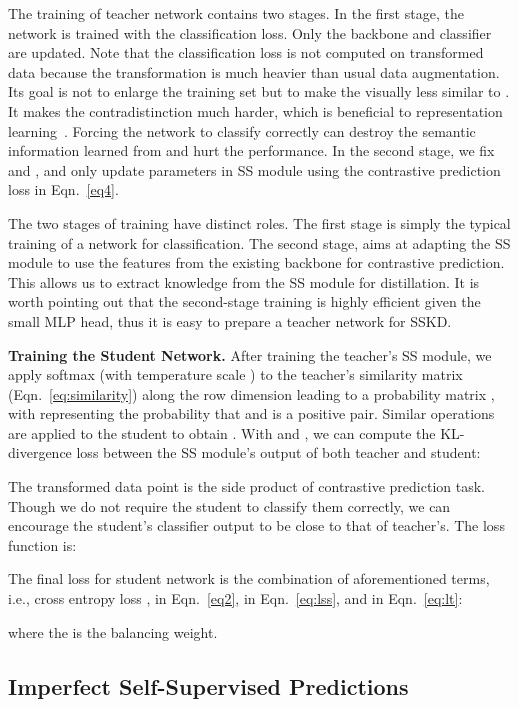 \documentclass[runningheads]{llncs}
\newcommand{\ie}{i.e.}
\begin{document}
The training of teacher network contains two stages. 
In the first stage, the network is trained with the classification loss. Only the backbone  and classifier  are updated. 
Note that the classification loss is not computed on transformed data  because the transformation  is much heavier than usual data augmentation. 
Its goal is not to enlarge the training set but to make the  visually less similar to . 
It makes the contradistinction much harder, which is beneficial to representation learning~\cite{SimCLR}. 
Forcing the network to classify  correctly can destroy the semantic information learned from  and hurt the performance.
In the second stage, we fix  and , and only update parameters in SS module  using the contrastive prediction loss in Eqn.~\eqref{eq4}.

The two stages of training have distinct roles. The first stage is simply the typical training of a network for classification. The second stage, aims at adapting the SS module to use the features from the existing backbone for contrastive prediction. This allows us to extract knowledge from the SS module for distillation. It is worth pointing out that the second-stage training is highly efficient given the small MLP head, thus it is easy to prepare a teacher network for SSKD. 



\vspace{0.1cm}
\noindent
\textbf{Training the Student Network.}
After training the teacher's SS module, we apply softmax (with temperature scale ) to the teacher's similarity matrix  (Eqn.~\eqref{eq:similarity}) along the row dimension leading to a probability matrix , with  representing the probability that  and  is a positive pair. Similar operations are applied to the student to obtain . With  and , we can compute the KL-divergence loss between the SS module's output of both teacher and student:


The transformed data point  is the side product of contrastive prediction task. Though we do not require the student to classify them correctly, we can encourage the student's classifier output  to be close to that of teacher's. The loss function is:

The final loss for student network is the combination of aforementioned terms, \ie, cross entropy loss ,  in Eqn.~\eqref{eq2},  in Eqn.~\eqref{eq:lss}, and  in Eqn.~\eqref{eq:lt}:

where the  is the balancing weight.



\subsection{Imperfect Self-Supervised Predictions}
\label{sec:suppress_noise}
\end{document}
